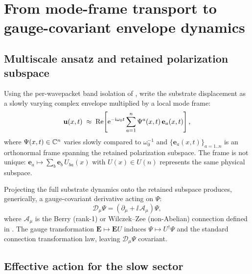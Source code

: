 \section{From mode-frame transport to gauge-covariant envelope dynamics}
\label{sec:effective-field}

\subsection{Multiscale ansatz and retained polarization subspace}

Using the per-wavepacket band isolation of , write the substrate
displacement as a slowly varying complex envelope multiplied by a local mode frame:
\begin{equation}
  \mathbf{u}(x,t)\;\approx\;
  \mathrm{Re}\!\left[
    \mathrm{e}^{-\mathrm{i}\omega_0 t}\sum_{a=1}^{n}\Psi^a(x,t)\,\mathbf{e}_a(x,t)
  \right],
  \label{eq:multiscale-ansatz}
\end{equation}
where $\Psi(x,t)\in\mathbb{C}^n$ varies slowly compared to $\omega_0^{-1}$ and
$\{\mathbf{e}_a(x,t)\}_{a=1..n}$ is an orthonormal frame spanning the retained polarization subspace.
The frame is not unique: $\mathbf{e}_a\mapsto \sum_b \mathbf{e}_b\,U_{ba}(x)$ with $U(x)\in U(n)$ represents the same
physical subspace.

Projecting the full substrate dynamics onto the retained subspace produces, generically, a gauge-covariant derivative
acting on $\Psi$:
\begin{equation}
  \mathcal{D}_\mu \Psi
  =
  \left(\partial_\mu + \ii\,\mathcal{A}_\mu\right)\Psi,
  \label{eq:covD}
\end{equation}
where $\mathcal{A}_\mu$ is the Berry (rank-1) or Wilczek--Zee (non-Abelian) connection defined in .
The gauge transformation $\mathbf{E}\mapsto \mathbf{E}U$ induces $\Psi\mapsto U^\dagger\Psi$ and the standard
connection transformation law, leaving $\mathcal{D}_\mu\Psi$ covariant.

\subsection{Effective action for the slow sector}

